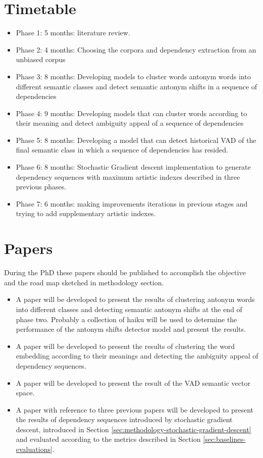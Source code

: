 \documentclass{article}
\begin{document}
	\section{Timetable}
	\begin{itemize}
		\item Phase 1: 5 months: literature review.
		\item Phase 2: 4 months: Choosing the corpora and dependency extraction from an unbiased corpus	
		\item Phase 3: 8 months: Developing models to cluster words antonym words into different semantic classes and detect semantic antonym shifts in a sequence of dependencies
		\item Phase 4: 9 months: Developing models that can cluster words according to their meaning and detect ambiguity appeal of a sequence of dependencies
		\item Phase 5: 8 months: Developing a model that can detect historical VAD of the final semantic class in which a sequence of dependencies has resided. 
		\item Phase 6: 8 months: Stochastic Gradient descent implementation to generate dependency sequences with maximum artistic indexes described in three previous phases. 
		\item Phase 7: 6 months: making improvements iterations in previous stages and trying to add supplementary artistic indexes. 
	\end{itemize}
	\section{Papers}
	During the PhD these papers should be published to accomplish the objective and the road map sketched in methodology section. 
	\begin{itemize} 
		\item A paper will be developed to present the results of clustering antonym words into different classes and detecting semantic antonym shifts at the end of phase two. Probably a collection of haiku will be used to determine the performance of the antonym shifts detector model and present the results. 
		\item A paper will be developed to present the results of clustering the word embedding according to their meanings and detecting the ambiguity appeal of dependency sequences. 
		\item A paper will be developed to present the result of the VAD semantic vector space. 
		\item A paper with reference to three previous papers will be developed to present the results of dependency sequences introduced by stochastic gradient descent, introduced in Section \ref{sec:methodology-stochastic-gradient-descent} and evaluated according to the metrics described in Section \ref{sec:baselines-evaluations}.
	\end{itemize}
	
\end{document}
